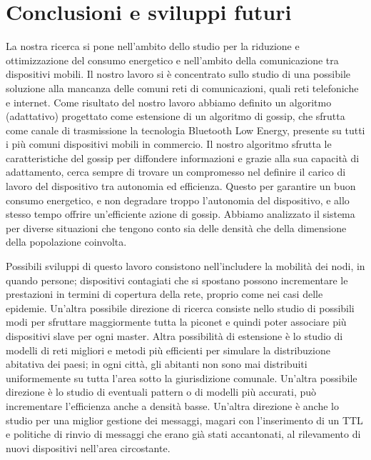 \chapter{Conclusioni e sviluppi futuri}
\label{chap:conclusioni_sviluppiFuturi}

La nostra ricerca si pone nell'ambito dello studio per la riduzione e ottimizzazione del consumo energetico e nell'ambito della comunicazione tra dispositivi mobili.  Il nostro lavoro si è concentrato sullo studio di una possibile soluzione alla mancanza delle comuni reti di comunicazioni, quali reti telefoniche e internet. Come risultato del nostro lavoro abbiamo definito un algoritmo (adattativo) progettato come estensione di un algoritmo di gossip, che sfrutta come canale di trasmissione la tecnologia Bluetooth Low Energy, presente su tutti i più comuni dispositivi mobili in commercio. Il nostro algoritmo sfrutta le caratteristiche del gossip per diffondere informazioni e grazie alla sua capacità di adattamento, cerca sempre di trovare un compromesso nel definire il carico di lavoro del dispositivo tra autonomia ed efficienza. Questo per garantire un buon consumo energetico, e non degradare troppo l'autonomia del dispositivo, e allo stesso tempo offrire un'efficiente azione di gossip. Abbiamo analizzato il sistema per diverse situazioni che tengono conto sia delle densità che della dimensione della popolazione coinvolta.

Possibili sviluppi di questo lavoro consistono nell'includere la mobilità dei nodi, in quando persone; dispositivi contagiati che si spostano possono incrementare le prestazioni in termini di copertura della rete, proprio come nei casi delle epidemie. Un'altra possibile direzione di ricerca consiste nello studio di possibili modi per sfruttare maggiormente tutta la piconet e quindi poter associare più dispositivi slave per ogni master. Altra possibilità di estensione è lo studio di modelli di reti migliori e metodi più efficienti per simulare la distribuzione abitativa dei paesi; in ogni città, gli abitanti non sono mai distribuiti uniformemente su tutta l'area sotto la giurisdizione comunale. Un'altra possibile direzione è lo studio di eventuali pattern o di modelli più accurati, può incrementare l'efficienza anche a densità basse. Un'altra direzione è anche lo studio per una miglior gestione dei messaggi, magari con l'inserimento di un \acf{TTL} e politiche di rinvio di messaggi che erano già stati accantonati, al rilevamento di nuovi dispositivi nell'area circostante.